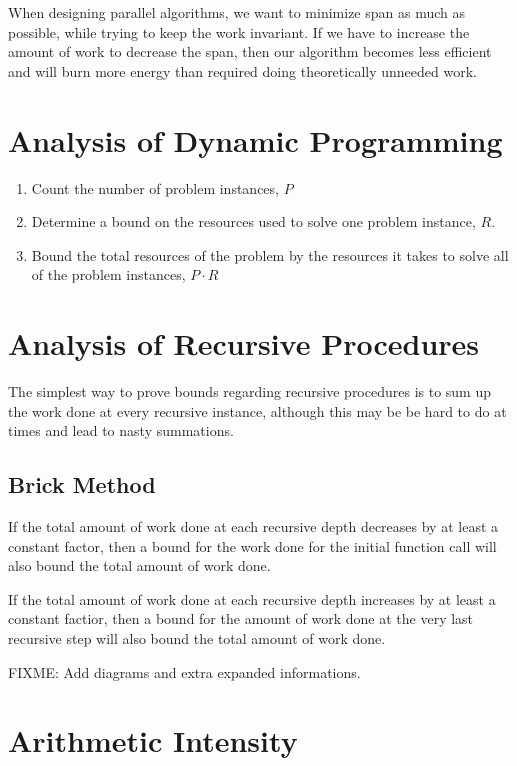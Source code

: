 \documentclass[12pt, letterpaper]{book}
\begin{document}
When designing parallel algorithms, we want to minimize span as much as possible, while trying to keep the work invariant. If we have to increase the amount of work to decrease the span, then our algorithm becomes less efficient and will burn more energy than required doing theoretically unneeded work.

\section{Analysis of Dynamic Programming}

\begin{enumerate}
  \item Count the number of problem instances, $P$
  \item Determine a bound on the resources used to solve one problem instance, $R$.
  \item Bound the total resources of the problem by the resources it takes to solve all of the problem instances, $P \cdot R$
\end{enumerate}

\section{Analysis of Recursive Procedures}

The simplest way to prove bounds regarding recursive procedures is to sum up the work done at every recursive instance, although this may be be hard to do at times and lead to nasty summations.

\subsection{Brick Method}
If the total amount of work done at each recursive depth decreases by at least a constant factor, then a bound for the work done for the initial function call will also bound the total amount of work done.

If the total amount of work done at each recursive depth increases by at least a constant factior, then a bound for the amount of work done at the very last recursive step will also bound the total amount of work done.

FIXME: Add diagrams and extra expanded informations.

\section{Arithmetic Intensity}
\end{document}
